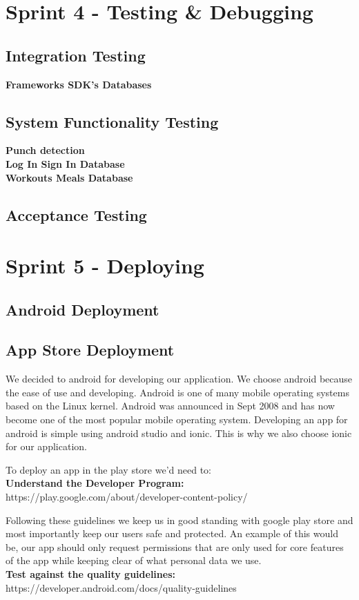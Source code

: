 \documentclass[a4paper,12pt]{report}
\begin{document}
\section{Sprint 4 - Testing \& Debugging}
\subsection{Integration Testing}
\textbf{Frameworks SDK's Databases }\\

\subsection{System Functionality Testing}
\textbf{Punch detection}\\
\textbf{Log In Sign In Database}\\
\textbf{Workouts Meals Database}
\subsection{Acceptance Testing}

\section{Sprint 5 - Deploying}
\subsection{Android Deployment}
\subsection{App Store Deployment}

We decided to android for developing our application. We choose android because the ease of use and developing. Android is one of many mobile operating systems based on the Linux kernel. Android was announced in Sept 2008 and has now become one of the most popular mobile operating system. Developing an app for android is simple using android studio and ionic. This is why we also choose ionic for our application. 

To deploy an app in the play store we'd need to:
\\
\textbf{Understand the Developer Program:} https://play.google.com/about/developer-content-policy/

Following these guidelines we keep us in good standing with google play store and most importantly keep our users safe and protected. An example of this would be, our app should only request permissions that are only used for core features of the app while keeping clear of what personal data we use.
\\
\textbf{Test against the quality guidelines:} https://developer.android.com/docs/quality-guidelines
\end{document}
